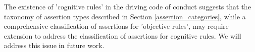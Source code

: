 The existence of 'cognitive rules' in the driving code of conduct suggests that the taxonomy of assertion types described in Section \ref{assertion_categories}, while a comprehensive classification of assertions for 'objective rules', may require extension to address the classification of assertions for cognitive rules. We will address this issue in future work.

%
%

